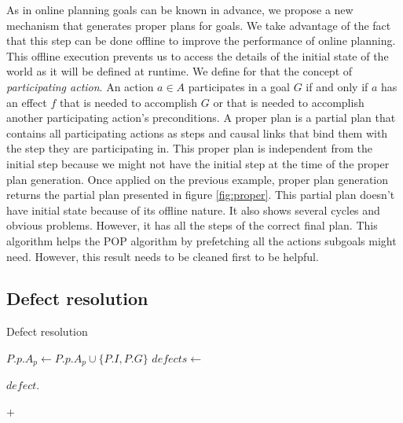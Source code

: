 \documentclass[]{article}
\begin{document}
As in online planning goals can be known in advance, we propose a new
mechanism that generates proper plans for goals. We take advantage of
the fact that this step can be done offline to improve the performance
of online planning. This offline execution prevents us to access the
details of the initial state of the world as it will be defined at
runtime. We define for that the concept of \emph{participating action}.
An action \(a \in A\) participates in a goal \(G\) if and only if \(a\)
has an effect \(f\) that is needed to accomplish \(G\) or that is needed
to accomplish another participating action's preconditions. A proper
plan is a partial plan that contains all participating actions as steps
and causal links that bind them with the step they are participating in.
This proper plan is independent from the initial step because we might
not have the initial step at the time of the proper plan generation.
Once applied on the previous example, proper plan generation returns the
partial plan presented in figure \ref{fig:proper}. This partial plan
doesn't have initial state because of its offline nature. It also shows
several cycles and obvious problems. However, it has all the steps of
the correct final plan. This algorithm helps the POP algorithm by
prefetching all the actions subgoals might need. However, this result
needs to be cleaned first to be helpful.

\hypertarget{defects}{\subsection{Defect resolution}\label{defects}}

\begin{algorithm}\caption{Defect resolution}\label{defectresolution}\begin{algorithmic}[1]

\footnotesize
{}
\State {}
\State {}
\State \(P.p.A_p \gets P.p.A_p \cup \{P.I, P.G\}\)
\State \(defects \gets\) 
\State {} \EndFunction

 \State \(defect.\)
 \EndFor
\EndFunction

 \State \Return {}
\(+\) 
\State {}
\EndFunction

\end{algorithmic}\end{algorithm}
\end{document}
